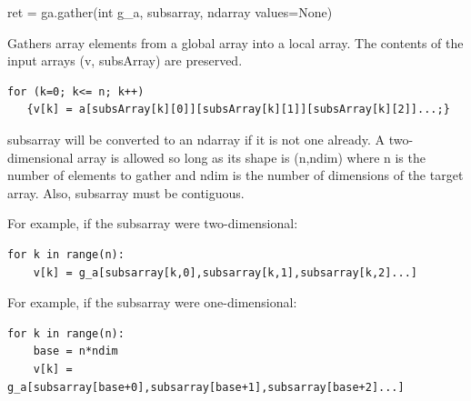 \documentclass[12pt]{article}
\begin{document}
\begin{pyapi}
\begin{pycode}
ret = ga.gather(int g_a, subsarray, ndarray values=None)
\end{pycode}
\begin{funcargs}
\end{funcargs}
\end{pyapi}

\ncoll

\begin{desc}

Gathers array elements from a global array into a local array. The contents of
the input arrays (v, subsArray) are preserved.

\begin{verbatim}
for (k=0; k<= n; k++)
   {v[k] = a[subsArray[k][0]][subsArray[k][1]][subsArray[k][2]]...;}
\end{verbatim}

\end{desc}

\begin{pydesc}

subsarray will be converted to an ndarray if it is not one already.  A
two-dimensional array is allowed so long as its shape is (n,ndim) where n is
the number of elements to gather and ndim is the number of dimensions of the
target array. Also, subsarray must be contiguous.

For example, if the subsarray were two-dimensional:

\begin{verbatim}
for k in range(n):
    v[k] = g_a[subsarray[k,0],subsarray[k,1],subsarray[k,2]...]
\end{verbatim}

For example, if the subsarray were one-dimensional:

\begin{verbatim}
for k in range(n):
    base = n*ndim
    v[k] = g_a[subsarray[base+0],subsarray[base+1],subsarray[base+2]...]
\end{verbatim}

\end{pydesc}


\end{document}

